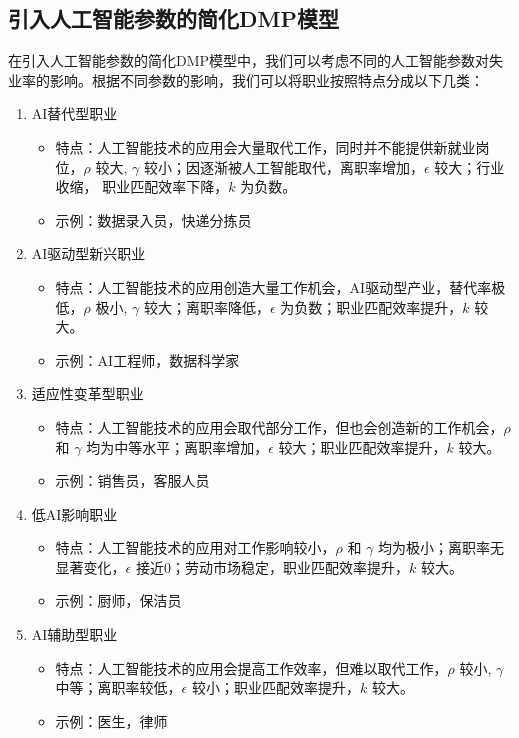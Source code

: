 \documentclass{article}
\begin{document}
\subsection{引入人工智能参数的简化DMP模型}

在引入人工智能参数的简化DMP模型中，我们可以考虑不同的人工智能参数对失业率的影响。根据不同参数的影响，我们可以将职业按照特点分成以下几类：

\begin{enumerate}[label=(\arabic*)]
    \item AI替代型职业
    
    \begin{itemize}
        \item 特点：人工智能技术的应用会大量取代工作，同时并不能提供新就业岗位，$\rho$ 较大, $\gamma$ 较小；因逐渐被人工智能取代，离职率增加，$\epsilon$ 较大；行业收缩， 职业匹配效率下降，$k$ 为负数。
        \item 示例：数据录入员，快递分拣员
    \end{itemize}

    \item AI驱动型新兴职业
    
    \begin{itemize}
        \item 特点：人工智能技术的应用创造大量工作机会，AI驱动型产业，替代率极低，$\rho$ 极小, $\gamma$ 较大；离职率降低，$\epsilon$ 为负数；职业匹配效率提升，$k$ 较大。
        \item 示例：AI工程师，数据科学家
    \end{itemize}
    
    \item 适应性变革型职业
    
    \begin{itemize}
        \item 特点：人工智能技术的应用会取代部分工作，但也会创造新的工作机会，$\rho$ 和 $\gamma$ 均为中等水平；离职率增加，$\epsilon$ 较大；职业匹配效率提升，$k$ 较大。
        \item 示例：销售员，客服人员
    \end{itemize}

    \item 低AI影响职业
    
    \begin{itemize}
        \item 特点：人工智能技术的应用对工作影响较小，$\rho$ 和 $\gamma$ 均为极小；离职率无显著变化，$\epsilon$ 接近0；劳动市场稳定，职业匹配效率提升，$k$ 较大。
        \item 示例：厨师，保洁员
    \end{itemize}

    \item AI辅助型职业
    
    \begin{itemize}
        \item 特点：人工智能技术的应用会提高工作效率，但难以取代工作，$\rho$ 较小, $\gamma$ 中等；离职率较低，$\epsilon$ 较小；职业匹配效率提升，$k$ 较大。
        \item 示例：医生，律师
    \end{itemize}
\end{enumerate}
\end{document}
